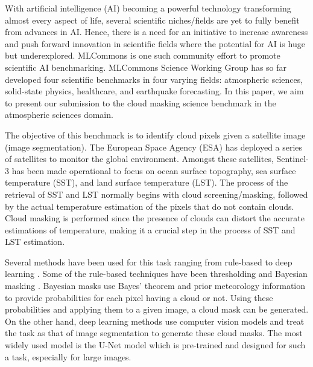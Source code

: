 \documentclass[sigplan,screen]{acmart}
\begin{document}
With artificial intelligence (AI) becoming a powerful technology transforming almost every aspect of life, several scientific niches/fields are yet to fully benefit from advances in AI. Hence, there is a need for an initiative to increase awareness and push forward innovation in scientific fields where the potential for AI is huge but underexplored. 
MLCommons \cite{www-mlcommons-research}  is one such community effort to promote scientific AI benchmarking. MLCommons Science Working Group \cite{Thiyagalingam2022AIBF} has so far developed four scientific benchmarks in four varying fields: atmospheric sciences, solid-state physics, healthcare, and earthquake forecasting. In this paper, we aim to present our submission to the cloud masking science benchmark in the atmospheric sciences domain. 

The objective of this benchmark \cite{Thiyagalingam2022AIBF} is to identify cloud pixels given a satellite image (image segmentation). The European Space Agency (ESA) \cite{www-sentinel92} has deployed a series of satellites to monitor the global environment. Amongst these satellites, Sentinel-3 has been made operational to focus on ocean surface topography, sea surface temperature (SST), and land surface temperature (LST). The process of the retrieval of SST and LST normally begins with cloud screening/masking, followed by the actual temperature estimation of the pixels that do not contain clouds. Cloud masking is performed since the presence of clouds can distort the accurate estimations of temperature, making it a crucial step in the process of SST and LST estimation. 





Several methods have been used for this task ranging from rule-based \cite{Saunders1986AnAS,Saunders1988AnIM,Merchant2005ProbabilisticPB, Zhu2012ObjectbasedCA} to deep learning \cite{Li2019DeepLB,Domnich2021KappaMaskAC,Yan2018CloudAC,WIELAND2019111203,JEPPESEN2019247}. Some of the rule-based techniques have been thresholding \cite{Saunders1986AnAS,Saunders1988AnIM} and Bayesian masking \cite{Merchant2005ProbabilisticPB}. Bayesian masks use Bayes' theorem and prior meteorology information to provide probabilities for each pixel having a cloud or not. Using these probabilities and applying them to a given image, a cloud mask can be generated. On the other hand, deep learning methods \cite{Li2019DeepLB,Domnich2021KappaMaskAC,Yan2018CloudAC,WIELAND2019111203,JEPPESEN2019247} use computer vision models and treat the task as that of image segmentation to generate these cloud masks. The most widely used model is the U-Net \cite{Ronneberger2015UNetCN} model which is pre-trained and designed for such a task, especially for large images.
\end{document}
